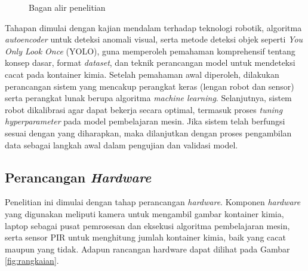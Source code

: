\begin{figure}[H]
  \caption{Bagan alir penelitian}
  \label{fig:bagan-umum}
\end{figure}
\vspace{-1em}

Tahapan dimulai dengan kajian mendalam terhadap teknologi robotik,
algoritma \textit{autoencoder} untuk deteksi anomali visual, serta
metode deteksi objek seperti \textit{You Only Look Once} (YOLO), guna
memperoleh pemahaman komprehensif tentang konsep dasar, format
\textit{dataset}, dan teknik perancangan model untuk mendeteksi cacat
pada kontainer kimia. Setelah pemahaman awal diperoleh, dilakukan
perancangan sistem yang mencakup perangkat keras (lengan robot dan
sensor) serta perangkat lunak berupa algoritma \textit{machine
learning}. Selanjutnya, sistem robot dikalibrasi agar dapat bekerja
secara optimal, termasuk proses \textit{tuning hyperparameter} pada
model pembelajaran mesin. Jika sistem telah berfungsi sesuai dengan
yang diharapkan, maka dilanjutkan dengan proses pengambilan data
sebagai langkah awal dalam pengujian dan validasi model.

\vspace{1em}

\subsection{Perancangan \textit{Hardware}}
Penelitian ini dimulai dengan tahap perancangan \textit{hardware}. Komponen
\textit{hardware} yang digunakan meliputi kamera untuk mengambil gambar
kontainer kimia, laptop sebagai pusat pemrosesan dan eksekusi
algoritma pembelajaran mesin, serta sensor PIR untuk menghitung
jumlah kontainer kimia, baik yang cacat maupun yang tidak. Adapun
rancangan hardware dapat dilihat pada Gambar \ref{fig:rangkaian}.


